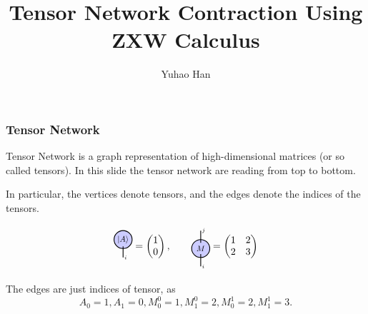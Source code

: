 \documentclass[aspectratio=169]{beamer}
\title[Tensor ZXW] %
{Tensor Network Contraction Using ZXW Calculus} %
\author{Yuhao Han}
\institute{Mathematical Institute\\University of Oxford}
\date[\today]  %
{} %
\newcommand{\ket}[1]{\left|#1\right\rangle}
\begin{document}
\begin{frame}[plain]
  \titlepage
\end{frame}


\begin{frame}
	\frametitle{Tensor Network}

	Tensor Network is a graph representation of high-dimensional matrices (or so called tensors). \cite{penrose1971applications}
	In this slide the tensor network are reading from top to bottom.
	
	In particular, the vertices denote tensors, and the edges denote the indices of the tensors.

	$$
	\begin{tikzpicture}[baseline=-0.1ex, scale=0.8, every node/.style={transform shape}]
		\draw[fill=blue!20, thick] (0,0.4) circle (0.4) node (A) {$\ket{A}$};
      \draw[thick] (A.south) -- (0,-0.4) node[right=-2pt] {\scriptsize $i$};
    \end{tikzpicture} =
	\begin{pmatrix}
		1 \\ 
		0
	\end{pmatrix}, \qquad 
	\begin{tikzpicture}[baseline=-0.1ex, scale=0.8, every node/.style={transform shape}]
		\draw[fill=blue!20, thick] (0,0.) circle (0.4) node (A) {$M$};
      \draw[thick] (A.south) -- (0,-0.8) node[right=-2pt] {\scriptsize $i$};
      \draw[thick] (A.north) -- (0,0.8) node[right=-2pt] {\scriptsize $j$};
    \end{tikzpicture} =
	\begin{pmatrix}
		1  & 2\\ 
		2  & 3
	\end{pmatrix}
	$$
	
	The edges are just indices of tensor, as
	$$
	A_0 = 1, A_1 = 0, M^0_0 = 1, M^0_1 = 2, M^1_0 = 2, M^1_1 = 3.
	$$
\end{frame}
\end{document}
